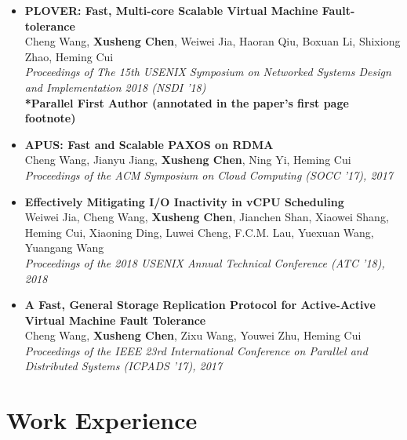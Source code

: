 \documentclass[a4paper,8pt]{article} %
\begin{document}
\begin{itemize}
    \item \textbf{PLOVER: Fast, Multi-core Scalable Virtual Machine Fault-tolerance}\\
    Cheng Wang, \textbf{Xusheng Chen}, Weiwei Jia, Haoran Qiu, Boxuan Li, Shixiong Zhao, Heming Cui\\
    \textit{Proceedings of The 15th USENIX Symposium on Networked Systems Design and Implementation 2018 (NSDI '18)}\\
    \textbf{*Parallel First Author (annotated in the paper's first page footnote)}\\

    \item \textbf{APUS: Fast and Scalable PAXOS on RDMA}\\
    Cheng Wang, Jianyu Jiang, \textbf{Xusheng Chen}, Ning Yi, Heming Cui\\
    \textit{Proceedings of the ACM Symposium on Cloud Computing (SOCC '17), 2017}\\

    \item \textbf{Effectively Mitigating I/O Inactivity in vCPU Scheduling} \\
    Weiwei Jia, Cheng Wang, \textbf{Xusheng Chen}, Jianchen Shan, Xiaowei Shang, Heming Cui, Xiaoning Ding, Luwei Cheng, F.C.M. Lau, Yuexuan Wang, Yuangang Wang \\
    \textit{Proceedings of the 2018 USENIX Annual Technical Conference (ATC '18), 2018} \\
    
    \item \textbf{A Fast, General Storage Replication Protocol for Active-Active Virtual Machine Fault Tolerance} \\
    Cheng Wang, \textbf{Xusheng Chen}, Zixu Wang, Youwei Zhu, Heming Cui\\
    \textit{Proceedings of the IEEE 23rd International Conference on Parallel and Distributed Systems (ICPADS '17), 2017}\\

\end{itemize}



\section{Work Experience}
\end{document}
